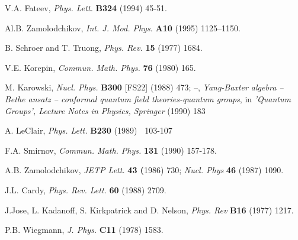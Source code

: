 \documentclass[a4paper,a4paper]{article}
\begin{document}
\begin{thebibliography}{99}
  V.A. Fateev, \emph{Phys. Lett. }\textbf{B324 }(1994) 45-51.

  Al.B. Zamolodchikov, \emph{Int. J. Mod. Phys. }\textbf{A10 }%
(1995) 1125--1150.

  B. Schroer and T. Truong, \emph{Phys. Rev. }\textbf{15 }(1977)
1684.

  V.E. Korepin, \emph{Commun. Math. Phys. }\textbf{76 }(1980)
165.

  M. Karowski, \emph{Nucl. Phys. }\textbf{B300 }[FS22] (1988)
473; --, \emph{Yang-Baxter algebra -- Bethe ansatz -- conformal quantum
field theories-quantum groups}, in \emph{'Quantum Groups', Lecture Notes in
Physics, Springer }(1990) 183

  A. LeClair, \emph{Phys. Lett. }\textbf{B230 }(1989)\textbf{\ }%
103-107

  F.A. Smirnov, \emph{Commun. Math. Phys. }\textbf{131 }(1990)
157-178.

  A.B. Zamolodchikov, \emph{JETP Lett. }\textbf{43 (}1986) 730; 
\emph{Nucl. Phys }\textbf{46 }(1987) 1090.

  J.L. Cardy, \emph{Phys. Rev. Lett. }\textbf{60 }(1988) 2709.

  J.Jose, L. Kadanoff, S. Kirkpatrick and D. Nelson, \emph{%
Phys. Rev }\textbf{B16 }(1977) 1217.

  P.B. Wiegmann, \emph{J. Phys. }\textbf{C11 }(1978) 1583.
\end{thebibliography}
\end{document}
